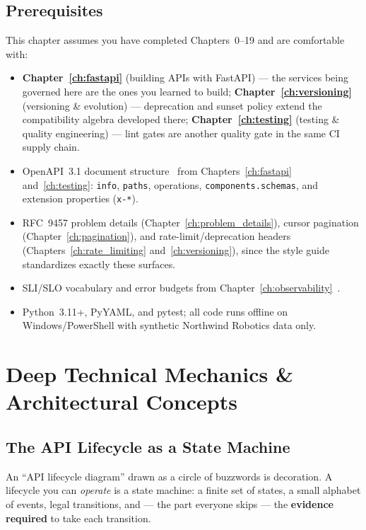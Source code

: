 \subsection*{Prerequisites}
This chapter assumes you have completed Chapters~0--19 and are comfortable
with:

\begin{itemize}
  \item \textbf{Chapter~\ref{ch:fastapi}} (building APIs with FastAPI) ---
        the services being governed here are the ones you learned to
        build; \textbf{Chapter~\ref{ch:versioning}} (versioning \&
        evolution) --- deprecation and sunset policy extend the
        compatibility algebra developed there; \textbf{Chapter~\ref{ch:testing}}
        (testing \& quality engineering) --- lint gates are another
        quality gate in the same CI supply chain.
  \item OpenAPI~3.1 document structure~\cite{openapi31} from
        Chapters~\ref{ch:fastapi} and~\ref{ch:testing}: \texttt{info},
        \texttt{paths}, operations, \texttt{components.schemas}, and
        extension properties (\texttt{x-*}).
  \item RFC~9457 problem details (Chapter~\ref{ch:problem_details}),
        cursor pagination (Chapter~\ref{ch:pagination}), and
        rate-limit/deprecation headers (Chapters~\ref{ch:rate_limiting}
        and~\ref{ch:versioning}), since the style guide standardizes
        exactly these surfaces.
  \item SLI/SLO vocabulary and error budgets from
        Chapter~\ref{ch:observability}~\cite{beyer2016sre}.
  \item Python~3.11+, PyYAML, and pytest; all code runs offline on
        Windows/PowerShell with synthetic Northwind Robotics data only.
\end{itemize}

\section{Deep Technical Mechanics \& Architectural Concepts}
\label{sec:ch20-mechanics}

\subsection{The API Lifecycle as a State Machine}
\label{sec:ch20-statemachine}

An ``API lifecycle diagram'' drawn as a circle of buzzwords is decoration.
A lifecycle you can \emph{operate} is a state machine: a finite set of
states, a small alphabet of events, legal transitions, and --- the part
everyone skips --- the \textbf{evidence required} to take each transition.

